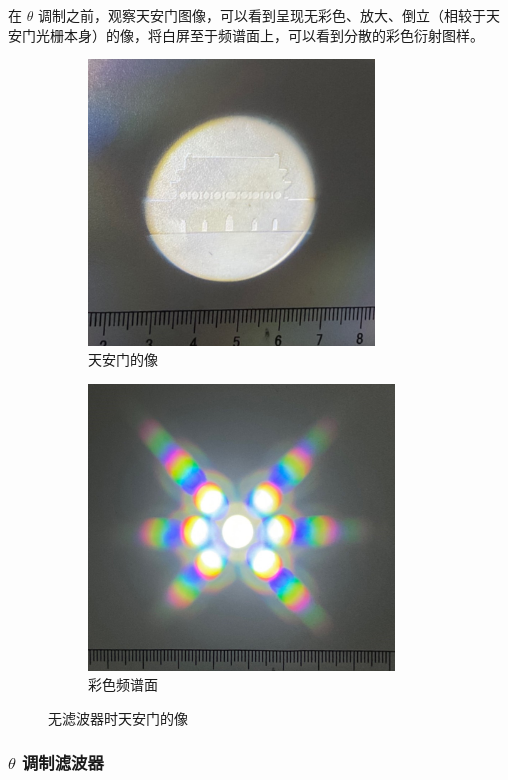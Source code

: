 \documentclass[UTF8]{article}
\theoremstyle{MyLineTheoremStyle} %
\theoremstyle{MyBlockTheoremStyle} %
\theoremstyle{MySubsubsectionStyle} %
\begin{document}
在  $\theta$  调制之前，观察天安门图像，可以看到呈现无彩色、放大、倒立（相较于天安门光栅本身）的像，将白屏至于频谱面上，可以看到分散的彩色衍射图样。
\begin{figure}[H]\centering
\begin{subfigure}[b]{0.5\columnwidth}\centering
    \includegraphics[height=215pt]{assets/3 假彩编码/天安门 无滤波器.jpg}
    \caption{天安门的像}
\end{subfigure}\hfill
\begin{subfigure}[b]{0.5\columnwidth}\centering
    \includegraphics[height=215pt]{assets/3 假彩编码/彩色频谱面 (2).jpg}
    \caption{彩色频谱面}
\end{subfigure}
\caption{无滤波器时天安门的像}
\end{figure}

\subsubsection{$\theta$ 调制滤波器}
\end{document}
